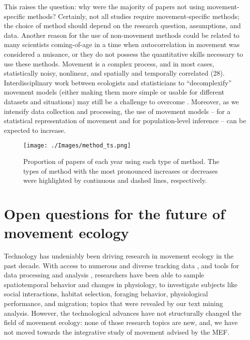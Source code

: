\documentclass[a4paper,12pt]{article}
\begin{document}
This raises the question: why were the majority of papers not using
movement-specific methods? Certainly, not all studies require
movement-specific methods; the choice of method should depend on the
research question, assumptions, and data. Another reason for the use of
non-movement methods could be related to many scientists coming-of-age
in a time when autocorrelation in movement was considered a nuisance, or
they do not possess the quantitative skills necessary to use these
methods. Movement is a complex process, and in most cases, statistically
noisy, nonlinear, and spatially and temporally correlated (28).
Interdisciplinary work between ecologists and statisticians to
``decomplexify'' movement models (either making them more simple or
usable for different datasets and situations) may still be a challenge
to overcome \cite{Williams2020}. Moreover, as we intensify data collection and
processing, the use of movement models -- for a statistical
representation of movement and for population-level inference -- can be
expected to increase.

\begin{figure}
	\texttt{[image: ./Images/method\_ts.png]}
	\caption{Proportion of papers of each year using each type of
		method. The types of method with the most pronounced increases or decreases were highlighted by continuous and dashed lines, respectively.}
	\label{fig:methods-ts}
\end{figure}



\section*{Open questions for the future of movement ecology}

Technology has undeniably been driving research in movement ecology in
the past decade. With access to numerous and diverse tracking data \cite{Baratchi2013},
and tools for data processing and analysis \cite{Borger2016,Joo2020}, researchers have
been able to sample spatiotemporal behavior and changes in physiology,
to investigate subjects like social interactions, habitat selection,
foraging behavior, physiological performance, and migration; topics that
were revealed by our text mining analysis. However, the technological
advances have not structurally changed the field of movement ecology:
none of those research topics are new, and, we have not moved towards
the integrative study of movement advised by the MEF.
\end{document}
